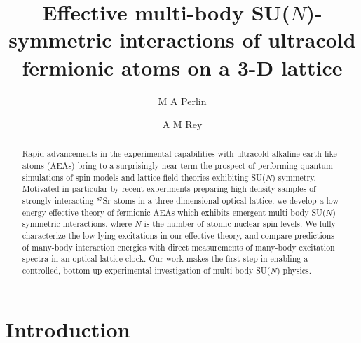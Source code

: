 \documentclass[preprint,showkeys,nofootinbib]{revtex4-1}
\newcommand{\1}{\mathds{1}}
\begin{document}
\title{Effective multi-body SU($N$)-symmetric interactions of
  ultracold fermionic atoms on a 3-D lattice}

\author{M A Perlin}
\author{A M Rey}

\begin{abstract}
  Rapid advancements in the experimental capabilities with ultracold
  alkaline-earth-like atoms (AEAs) bring to a surprisingly near term
  the prospect of performing quantum simulations of spin models and
  lattice field theories exhibiting SU($N$) symmetry.  Motivated in
  particular by recent experiments preparing high density samples of
  strongly interacting ${}^{87}$Sr atoms in a three-dimensional
  optical lattice, we develop a low-energy effective theory of
  fermionic AEAs which exhibits emergent multi-body SU($N$)-symmetric
  interactions, where $N$ is the number of atomic nuclear spin levels.
  We fully characterize the low-lying excitations in our effective
  theory, and compare predictions of many-body interaction energies
  with direct measurements of many-body excitation spectra in an
  optical lattice clock.  Our work makes the first step in enabling a
  controlled, bottom-up experimental investigation of multi-body
  SU($N$) physics.
\end{abstract}


\maketitle

\tableofcontents


\section{Introduction}
\label{sec:introduction}
\end{document}

